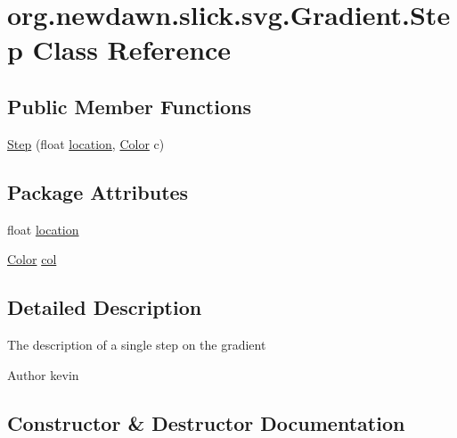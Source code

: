 \hypertarget{classorg_1_1newdawn_1_1slick_1_1svg_1_1_gradient_1_1_step}{}\section{org.\+newdawn.\+slick.\+svg.\+Gradient.\+Step Class Reference}
\label{classorg_1_1newdawn_1_1slick_1_1svg_1_1_gradient_1_1_step}
\subsection*{Public Member Functions}
\begin{DoxyCompactItemize}
\item 
\mbox{\hyperlink{classorg_1_1newdawn_1_1slick_1_1svg_1_1_gradient_1_1_step_a447f57ade3b93161fe8c56f3c5e72978}{Step}} (float \mbox{\hyperlink{classorg_1_1newdawn_1_1slick_1_1svg_1_1_gradient_1_1_step_a85a5f4a48eb280eb8e540918ed758c49}{location}}, \mbox{\hyperlink{classorg_1_1newdawn_1_1slick_1_1_color}{Color}} c)
\end{DoxyCompactItemize}
\subsection*{Package Attributes}
\begin{DoxyCompactItemize}
\item 
float \mbox{\hyperlink{classorg_1_1newdawn_1_1slick_1_1svg_1_1_gradient_1_1_step_a85a5f4a48eb280eb8e540918ed758c49}{location}}
\item 
\mbox{\hyperlink{classorg_1_1newdawn_1_1slick_1_1_color}{Color}} \mbox{\hyperlink{classorg_1_1newdawn_1_1slick_1_1svg_1_1_gradient_1_1_step_a0d4bf9d51103987e597af344680fc9bc}{col}}
\end{DoxyCompactItemize}


\subsection{Detailed Description}
The description of a single step on the gradient

\begin{DoxyAuthor}{Author}
kevin 
\end{DoxyAuthor}


\subsection{Constructor \& Destructor Documentation}
\mbox{\label{classorg_1_1newdawn_1_1slick_1_1svg_1_1_gradient_1_1_step_a447f57ade3b93161fe8c56f3c5e72978}} 
